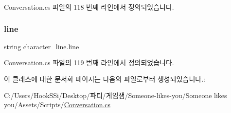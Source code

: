 Conversation.\+cs 파일의 118 번째 라인에서 정의되었습니다.

\mbox{\label{classcharacter__line_a088bbc85d8d168464f1e76262690413b}} 
\subsubsection{\texorpdfstring{line}{line}}
{\footnotesize\ttfamily string character\+\_\+line.\+line}



Conversation.\+cs 파일의 119 번째 라인에서 정의되었습니다.



이 클래스에 대한 문서화 페이지는 다음의 파일로부터 생성되었습니다.\+:\begin{DoxyCompactItemize}
\item 
C\+:/\+Users/\+Hook\+S\+Si/\+Desktop/파티/게임잼/\+Someone-\/likes-\/you/\+Someone likes you/\+Assets/\+Scripts/\mbox{\hyperlink{_conversation_8cs}{Conversation.\+cs}}\end{DoxyCompactItemize}
